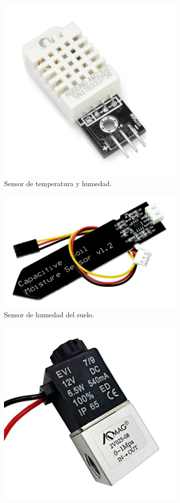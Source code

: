 \begin{figure}[!htpb]
     \centering
     \begin{subfigure}[b]{0.3\textwidth}
         \centering
         \includegraphics[width=.65\textwidth]{./Figures/dht22.jpg}
         \caption{Sensor de temperatura y humedad.}
         \label{fig:dht22}
     \end{subfigure}
     \hfill
     \begin{subfigure}[b]{0.3\textwidth}
         \centering
         \includegraphics[width=.65\textwidth]{./Figures/soilsensor}
         \caption{Sensor de humedad del suelo.}
         \label{fig:soilsensor}
     \end{subfigure}
     \hfill
     \begin{subfigure}[b]{0.3\textwidth}
         \centering
         \includegraphics[width=.65\textwidth]{./Figures/valve.jpg}

\end{subfigure}
\end{figure}
